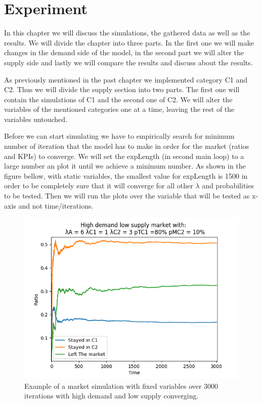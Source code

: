 \chapter{Experiment}

In this chapter we will discuss the simulations, the gathered data as well as the results. We will divide the chapter into three parts. In the first one we will make changes in the demand side of the model, in the second part we will alter the supply side and lastly we will compare the results and discuss about the results.

As previously mentioned in the past chapter we implemented category C1 and C2. Thus we will divide the supply section into two parts. The first one will contain the simulations of C1 and the second one of C2. We will alter the variables of the mentioned categories one at a time, leaving the rest of the variables untouched. 

Before we can start simulating we have to empirically search for minimum number of iteration that the model has to make in order for the market (ratios and KPIs) to converge. We will set the expLength (in second main loop) to a large number an plot it until we achieve a minimum number. As shown in the figure bellow, with static variables, the smallest value for expLength is 1500 in order to be completely sure that it will converge for all other $\lambda$ and probabilities to be tested. Then we will run the plots over the variable that will be tested as x-axis and not time/iterations.

\begin{figure}
    \centering
    \includegraphics[width=0.6\linewidth]{figures/Rates_of_total_agents_distribution_over_time.png}
    \caption{Example of a market simulation with fixed variables over 3000 iterations with high demand and low supply converging.}
    \label{fig:convergence}
\end{figure}


